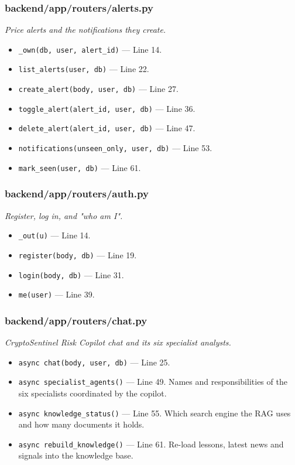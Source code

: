 \subsubsection*{backend/app/routers/alerts.py}
\textit{Price alerts and the notifications they create.}
\begin{itemize}[nosep,leftmargin=1.5em]
\item \texttt{\_\allowbreak{}own(\allowbreak{}db,\allowbreak{} user,\allowbreak{} alert\_\allowbreak{}id)} --- Line 14.
\item \texttt{list\_\allowbreak{}alerts(\allowbreak{}user,\allowbreak{} db)} --- Line 22.
\item \texttt{create\_\allowbreak{}alert(\allowbreak{}body,\allowbreak{} user,\allowbreak{} db)} --- Line 27.
\item \texttt{toggle\_\allowbreak{}alert(\allowbreak{}alert\_\allowbreak{}id,\allowbreak{} user,\allowbreak{} db)} --- Line 36.
\item \texttt{delete\_\allowbreak{}alert(\allowbreak{}alert\_\allowbreak{}id,\allowbreak{} user,\allowbreak{} db)} --- Line 47.
\item \texttt{notifications(\allowbreak{}unseen\_\allowbreak{}only,\allowbreak{} user,\allowbreak{} db)} --- Line 53.
\item \texttt{mark\_\allowbreak{}seen(\allowbreak{}user,\allowbreak{} db)} --- Line 61.
\end{itemize}
\subsubsection*{backend/app/routers/auth.py}
\textit{Register, log in, and "who am I".}
\begin{itemize}[nosep,leftmargin=1.5em]
\item \texttt{\_\allowbreak{}out(\allowbreak{}u)} --- Line 14.
\item \texttt{register(\allowbreak{}body,\allowbreak{} db)} --- Line 19.
\item \texttt{login(\allowbreak{}body,\allowbreak{} db)} --- Line 31.
\item \texttt{me(\allowbreak{}user)} --- Line 39.
\end{itemize}
\subsubsection*{backend/app/routers/chat.py}
\textit{CryptoSentinel Risk Copilot chat and its six specialist analysts.}
\begin{itemize}[nosep,leftmargin=1.5em]
\item \texttt{async chat(\allowbreak{}body,\allowbreak{} user,\allowbreak{} db)} --- Line 25.
\item \texttt{async specialist\_\allowbreak{}agents(\allowbreak{})} --- Line 49. Names and responsibilities of the six specialists coordinated by the copilot.
\item \texttt{async knowledge\_\allowbreak{}status(\allowbreak{})} --- Line 55. Which search engine the RAG uses and how many documents it holds.
\item \texttt{async rebuild\_\allowbreak{}knowledge(\allowbreak{})} --- Line 61. Re-load lessons, latest news and signals into the knowledge base.
\end{itemize}

